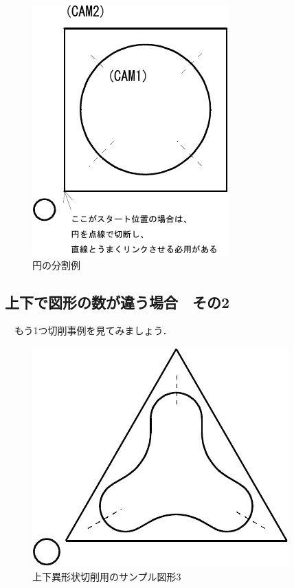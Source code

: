 \begin{minipage}{0.5\textwidth}
\begin{figure}[H]
\centering
\includegraphics{No2/fig/sample4-crop.pdf}
\caption{円の分割例}
\label{fig:sample4.pdf}
\end{figure}
\end{minipage}

\subsection{上下で図形の数が違う場合　その2}
　もう1つ切削事例を見てみましょう．

\begin{figure}[H]
\centering
\includegraphics{No2/fig/sample5-crop.pdf}
\caption{上下異形状切削用のサンプル図形3}
\label{fig:sample5.pdf}
\end{figure}

